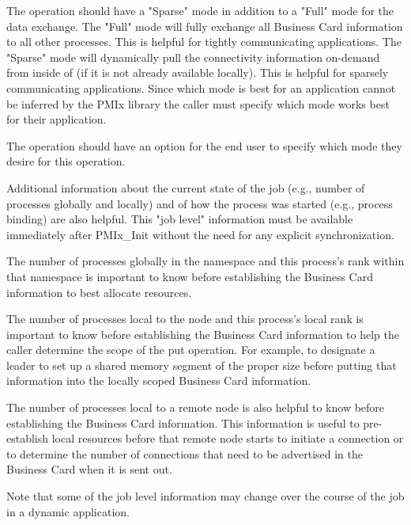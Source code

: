 The  operation should have a "Sparse" mode in addition to a "Full" mode for the data exchange. The "Full" mode will fully exchange all Business Card information to all other processes. This is helpful for tightly communicating applications. The "Sparse" mode will dynamically pull the connectivity information on-demand from inside of  (if it is not already available locally). This is helpful for sparsely communicating applications. Since which mode is best for an application cannot be inferred by the PMIx library the caller must specify which mode works best for their application.

The  operation should have an option for the end user to specify which mode they desire for this operation.

Additional information about the current state of the job (e.g., number of processes globally and locally) and of how the process was started (e.g., process binding) are also helpful. This "job level" information must be available immediately after PMIx_Init without the need for any explicit synchronization.

The number of processes globally in the namespace and this process's rank within that namespace is important to know before establishing the Business Card information to best allocate resources.

The number of processes local to the node and this process's local rank is important to know before establishing the Business Card information to help the caller determine the scope of the put operation. For example, to designate a leader to set up a shared memory segment of the proper size before putting that information into the locally scoped Business Card information.

The number of processes local to a remote node is also helpful to know before establishing the Business Card information. This information is useful to pre-establish local resources before that remote node starts to initiate a connection or to determine the number of connections that need to be advertised in the Business Card when it is sent out.

Note that some of the job level information may change over the course of the job in a dynamic application.


{\large {}}

{\large {}}

